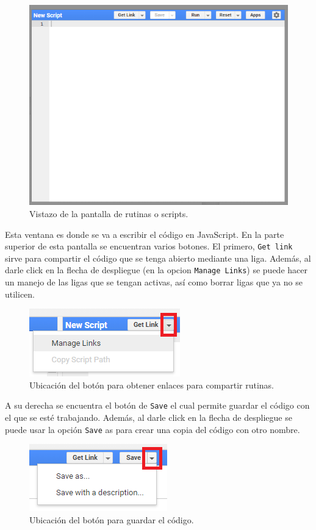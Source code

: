 \documentclass[
  12pt,
  letterpaper,
  twoside]{book}
\begin{document}
\begin{figure}

{\centering \includegraphics[width=0.5\linewidth]{Img/editor} 

}

\caption{Vistazo de la pantalla de rutinas o scripts.}\label{fig:unnamed-chunk-14}
\end{figure}

Esta ventana es donde se va a escribir el código en JavaScript. En la parte superior de esta pantalla se encuentran varios botones. El primero, \texttt{Get\ link} sirve para compartir el código que se tenga abierto mediante una liga. Además, al darle click en la flecha de despliegue (en la opcion \texttt{Manage\ Links}) se puede hacer un manejo de las ligas que se tengan activas, así como borrar ligas que ya no se utilicen.

\begin{figure}

{\centering \includegraphics[width=0.3\linewidth]{Img/links} 

}

\caption{Ubicación del botón para obtener enlaces para compartir rutinas.}\label{fig:unnamed-chunk-15}
\end{figure}

A su derecha se encuentra el botón de \texttt{Save} el cual permite guardar el código con el que se esté trabajando. Además, al darle click en la flecha de despliegue se puede usar la opción \texttt{Save} as para crear una copia del código con otro nombre.

\begin{figure}

{\centering \includegraphics[width=0.3\linewidth]{Img/save} 

}

\caption{Ubicación del botón para guardar el código.}\label{fig:unnamed-chunk-16}
\end{figure}
\end{document}
